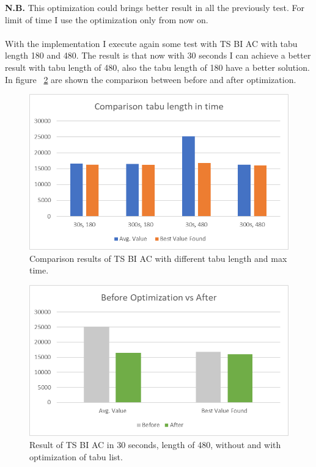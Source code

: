 			\textbf{N.B.} This optimization could brings better result in all the previously test. For limit of time I use the optimization only from now on.
			
			\paragraph*{} With the implementation I execute again some test with TS BI AC with tabu length 180 and 480. The result is that now with 30 seconds I can achieve a better result with tabu length of 480, also the tabu length of 180 have a better solution. In figure ~\ref{fig:ri-calibration-optimize} are shown the comparison between before and after optimization. 
			
			
\newpage		
	
			\begin{figure}
				\centering
				\includegraphics[width=\linewidth]{img/RI-calibration-TabuLengthInTime}
				\caption{Comparison results of TS BI AC with different tabu length and max time.}
				\label{fig:ri-calibration-tabulengthintime}
			\end{figure}
		
			\begin{figure}
				\centering
				\includegraphics[width=\linewidth]{img/RI-calibration-optimize}
				\caption{Result of TS BI AC in 30 seconds, length of 480, without and with optimization of tabu list.}
				\label{fig:ri-calibration-optimize}
			\end{figure}
		
		
			
			
		
			
			
		
			
		
			
			
			
	
	
	
		
		
	